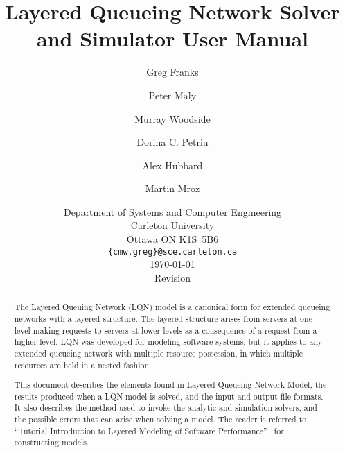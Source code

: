 \documentclass{report}
\begin{document}
\title{Layered Queueing Network Solver and Simulator User Manual}
\author{Greg Franks \and Peter Maly \and Murray Woodside \and Dorina
  C. Petriu \and Alex Hubbard \and Martin Mroz}
\date{Department of Systems and Computer Engineering\\
  Carleton University\\
  Ottawa ON K1S~5B6\\
  \texttt{\{cmw,greg\}@sce.carleton.ca}\\[1cm]
  \today\\[1cm]
  $\ $Revision$\ $ } \maketitle \clearpage
\tableofcontents
\clearpage
\begin{abstract}
  
The Layered Queuing Network (LQN) model is a canonical form for extended
queueing networks with a layered structure.
The layered structure arises from servers at one level making requests to servers at lower levels as a
consequence of a request from a higher level. LQN was developed for modeling software systems, but it
applies to any extended queueing network with multiple resource possession, in
which multiple resources are held in a nested fashion.

This document describes the elements found in Layered Queueing Network Model, the results produced when a
LQN model is solved, and the input and output file formats.  It also describes the method used to invoke the
analytic and simulation solvers, and the possible errors that can arise when solving a model.  The reader is
referred to ``Tutorial Introduction to Layered Modeling of Software Performance''~\cite{sw:woodside-xx} for
constructing models.
\end{abstract}










\appendix

\clearpage


%
\clearpage
\printindex
\end{document}
